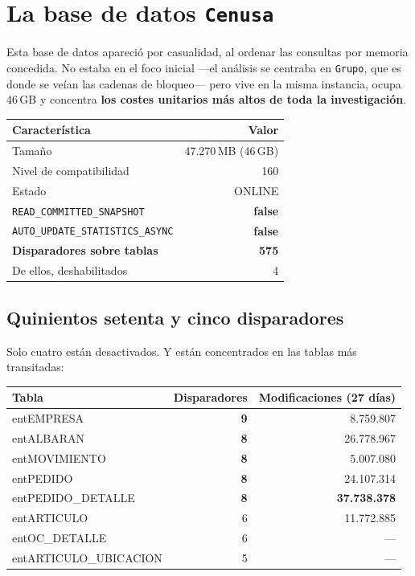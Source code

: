 \documentclass[11pt,a4paper]{article}
\newcommand{\cod}[1]{\texttt{\small #1}}
\newcommand{\critico}[1]{\textcolor{rojo}{\textbf{#1}}}
\begin{document}
\newpage
\section{La base de datos \cod{Cenusa}}

Esta base de datos apareció por casualidad, al ordenar las consultas por
memoria concedida. No estaba en el foco inicial —el análisis se centraba en
\cod{Grupo}, que es donde se veían las cadenas de bloqueo— pero vive en la
misma instancia, ocupa 46\,GB y concentra \textbf{los costes unitarios más
altos de toda la investigación}.

\begin{table}[h]
\centering
\small
\begin{tabular}{lr}
\toprule
\textbf{Característica} & \textbf{Valor} \\
\midrule
Tamaño                              & 47.270\,MB (46\,GB) \\
Nivel de compatibilidad             & 160 \\
Estado                              & ONLINE \\
\cod{READ\_COMMITTED\_SNAPSHOT}     & \critico{false} \\
\cod{AUTO\_UPDATE\_STATISTICS\_ASYNC} & \critico{false} \\
\textbf{Disparadores sobre tablas}  & \critico{575} \\
De ellos, deshabilitados            & 4 \\
\bottomrule
\end{tabular}
\end{table}

\subsection{Quinientos setenta y cinco disparadores}

Solo cuatro están desactivados. Y están concentrados en las tablas más
transitadas:

\begin{table}[h]
\centering
\small
\begin{tabular}{lrr}
\toprule
\textbf{Tabla} & \textbf{Disparadores} & \textbf{Modificaciones (27 días)} \\
\midrule
entEMPRESA           & \critico{9} &  8.759.807 \\
entALBARAN           & \critico{8} & 26.778.967 \\
entMOVIMIENTO        & \critico{8} &  5.007.080 \\
entPEDIDO            & \critico{8} & 24.107.314 \\
entPEDIDO\_DETALLE   & \critico{8} & \critico{37.738.378} \\
entARTICULO          & 6 & 11.772.885 \\
entOC\_DETALLE       & 6 & --- \\
entARTICULO\_UBICACION & 5 & --- \\
\bottomrule
\end{tabular}
\end{table}
\end{document}
